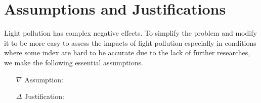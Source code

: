 \section{Assumptions and Justifications}
Light pollution has complex negative effects. To simplify the problem and modify it to be more easy to assess the impacts of light pollution especially in conditions where some index are hard to be accurate due to the lack of further researches, we make the following essential assumptions.
\begin{itemize}
    \item[$\nabla$] Assumption:
    \item[$\Delta$] Justification:
\end{itemize}